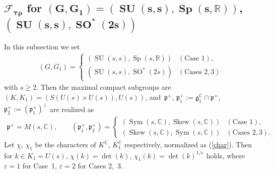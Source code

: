 \documentclass[pdftex]{sigma}
\numberwithin{equation}{section}
\newcommand{\BR}{\mathbb{R}}
\newcommand{\BC}{\mathbb{C}}
\newcommand{\fg}{\mathfrak{g}}
\newcommand{\fp}{\mathfrak{p}}
\newcommand{\cF}{\mathcal{F}}
\newcommand{\Sym}{\operatorname{Sym}}
\newcommand{\Skew}{\operatorname{Skew}}
\begin{document}
\subsection[$\cF_{\tau\rho}$ for $(G,G_1)=(\operatorname{SU}(s,s), \operatorname{Sp}(s,\BR))$, $(\operatorname{SU}(s,s), \operatorname{SO}^*(2s))$]{$\boldsymbol{\cF_{\tau\rho}}$ for $\boldsymbol{(G,G_1)=(\operatorname{SU}(s,s), \operatorname{Sp}(s,\BR))}$, $\boldsymbol{(\operatorname{SU}(s,s), \operatorname{SO}^*(2s))}$}
In this subsection we set
\begin{gather*} (G,G_1)=\begin{cases}(\operatorname{SU}(s,s), \operatorname{Sp}(s,\BR))& (\text{Case }1),\\
(\operatorname{SU}(s,s), \operatorname{SO}^*(2s))& (\text{Cases }2,3) \end{cases} \end{gather*}
with $s\ge 2$. Then the maximal compact subgroups are $(K,K_1)=(S(U(s)\times U(s)), U(s))$, and~$\fp^+$, $\fp^+_1:=\fg_1^\BC\cap\fp^+$, $\fp^+_2:=(\fp^+_1)^\bot$ are realized as
\begin{gather*} \fp^+=M(s,\BC),\qquad (\fp^+_1,\fp^+_2)=\begin{cases}
(\Sym(s,\BC),\Skew(s,\BC))& (\text{Case }1),\\ (\Skew(s,\BC),\Sym(s,\BC))& (\text{Cases }2,3). \end{cases} \end{gather*}
Let $\chi$, $\chi_1$ be the characters of $K^\BC$, $K_1^\BC$ respectively, normalized as (\ref{char}).
Then for $k\in K_1=U(s)$, $\chi(k)=\det(k)$, $\chi_1(k)=\det(k)^{1/\varepsilon}$ holds, where $\varepsilon=1$ for Case~1,
$\varepsilon=2$ for Cases 2,~3.
\end{document}
